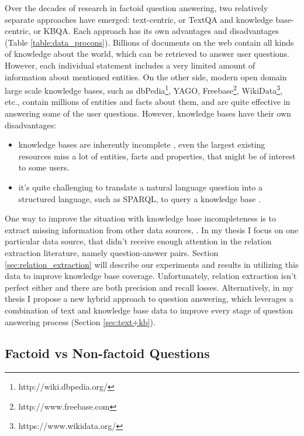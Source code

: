 Over the decades of research in factoid question answering, two relatively separate approaches have emerged: text-centric, or TextQA and knowledge base-centric, or KBQA.
Each approach has its own advantages and disadvantages (Table \ref{table:data_procons}).
Billions of documents on the web contain all kinds of knowledge about the world, which can be retrieved to answer user questions.
However, each individual statement includes a very limited amount of information about mentioned entities.
On the other side, modern open domain large scale knowledge bases, such as dbPedia\footnote{http://wiki.dbpedia.org/}, YAGO\cite{yago3}, Freebase\footnote{http://www.freebase.com}, WikiData\footnote{https://www.wikidata.org/}, etc., contain millions of entities and facts about them, and are quite effective in answering some of the user questions.
However, knowledge bases have their own disadvantages:
\begin{itemize}
\item knowledge bases are inherently incomplete \cite{Dong:2014:KVW:2623330.2623623}, even the largest existing resources miss a lot of entities, facts and properties, that might be of interest to some users.
\item it's quite challenging to translate a natural language question into a structured language, such as SPARQL, to query a knowledge base \cite{BerantCFL13:sempre}.
\end{itemize}

One way to improve the situation with knowledge base incompleteness is to extract missing information from other data sources, \eg \cite{Cafarella:2008:WEP:1453856.1453916,Cafarella:2009:WES:1519103.1519112,Dong:2014:KVW:2623330.2623623,Etzioni:2008:OIE:1409360.1409378,Gupta:2014:BOS:2732286.2732288,kushmerick1997wrapper}.
In my thesis I focus on one particular data source, that didn't receive enough attention in the relation extraction literature, namely question-answer pairs.
Section \ref{sec:relation_extraction} will describe our experiments and results in utilizing this data to improve knowledge base coverage.
Unfortunately, relation extraction isn't perfect either and there are both precision and recall losses.
Alternatively, in my thesis I propose a new hybrid approach to question answering, which leverages a combination of text and knowledge base data to improve every stage of question answering process (Section \ref{sec:text+kb}).

\subsection{Factoid vs Non-factoid Questions}

